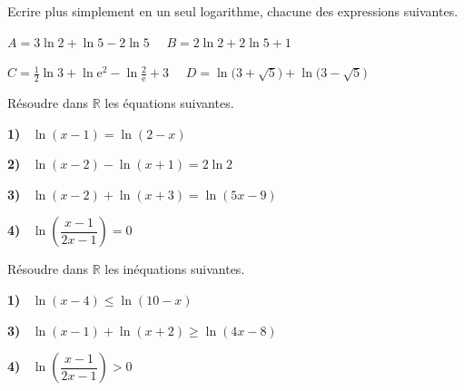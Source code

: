 



 
	\begin{exercice}
Ecrire plus simplement en un seul logarithme, chacune des expressions suivantes.

\medskip

 $ A=3\ln 2+\ln 5-2\ln 5\quad  $  $ B=2\ln 2+2\ln 5+1 $ 
 \bigskip
 
  $ C=\frac{1}{2}\ln3+ \ln \text{e}^2-\ln \frac{2}{\text{e}}+3\quad  $  $ D=\ln \bigl(3+\sqrt{5}\bigr)+\ln \bigl(3-\sqrt{5}\bigr) $
\end{exercice}

\begin{exercice}
Résoudre dans $ \mathbb{R} $ les équations suivantes.\medskip

\textbf{1)}  $ \;\;\ln(x-1)=\ln(2-x)  $  \medskip

\textbf{2)} $\;\; \ln (x -2)-\ln (x+1)=2\ln 2 $ \medskip

 \textbf{3)} $\;\; \ln ( x-2 )+\ln (x+3)=\ln(5x-9)$ \medskip
 
  \textbf{4)} $ \;\;\ln \left(\dfrac{x-1}{2x-1}\right) =0$ 
\end{exercice}

\begin{exercice}
Résoudre dans $ \mathbb{R} $ les inéquations suivantes.\medskip

\textbf{1)}  $\;\; \ln(x-4)\leq \ln(10-x)  $  \medskip

 \textbf{3)} $\;\; \ln ( x-1 )+\ln (x+2)\geq \ln (4x-8)$ \medskip
 
  \textbf{4)} $\;\; \ln \left(\dfrac{x-1}{2x-1}\right) >0$ 
\end{exercice}

